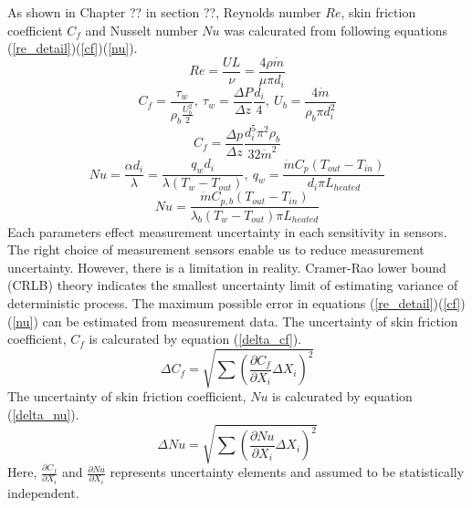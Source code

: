 \documentclass[12pt,oneside]{jbook}
\begin{document}
As shown in Chapter ?? in section ??, Reynolds number $Re$, skin friction coefficient $C_{f}$ and Nusselt number $Nu$ was calcurated from following equations (\ref{re_detail})(\ref{cf})(\ref{nu}).
\begin{equation}
    Re = \frac{UL}{\nu} = \frac{4\rho \dot{m}}{\mu \pi d_{i}}
    \label{re_detail}
\end{equation}
\begin{equation}
    C_{f} = \frac{\tau_{w}}{\rho_{b}\frac{U_{b}^{2}}{2}}, \ \tau_{w}=\frac{\Delta P}{\Delta z}\frac{d_{i}}{4}, \ U_{b}=\frac{4\dot{m}}{\rho_{b}\pi d_{i}^{2}}
    \label{cf_detail}
\end{equation}
\begin{equation}
    C_{f} = \frac{\Delta p}{\Delta z} \frac{d_{i}^{5}\pi^{2}\rho_{b}}{32\dot{m}^{2}}
    \label{cf}
\end{equation}
\begin{equation}
   Nu = \frac{\alpha d_{i}}{\lambda} = \frac{q_{w}d_{i}}{\lambda \left( T_{w}-T_{out} \right)}, \ q_{w}=\frac{\dot{m}C_{p} \left( T_{out}-T_{in} \right)}{d_{i}\pi L_{heated}}
   \label{nu_detail}
\end{equation}
\begin{equation}
   Nu = \frac{\dot{m}C_{p,b} \left( T_{out} - T_{in} \right) }{\lambda_{b} \left( T_{w} - T_{out} \right) \pi L_{heated}}
   \label{nu}
\end{equation}
Each parameters effect measurement uncertainty in each sensitivity in sensors.
The right choice of measurement sensors enable us to reduce measurement uncertainty.
However, there is a limitation in reality.
Cramer-Rao lower bound (CRLB) theory indicates the smallest uncertainty limit of estimating variance of deterministic process.
The maximum possible error in equations (\ref{re_detail})(\ref{cf})(\ref{nu}) can be estimated from measurement data.
The uncertainty of skin friction coefficient, $C_{f}$ is calcurated by equation (\ref{delta_cf}).
\begin{equation}
   \Delta C_{f} = \sqrt{\sum \left( \frac{\partial C_{f}}{\partial X_{i}}\Delta X_{i} \right)^{2}}
   \label{delta_cf}
\end{equation}
The uncertainty of skin friction coefficient, $Nu$ is calcurated by equation (\ref{delta_nu}).
\begin{equation}
   \Delta Nu = \sqrt{\sum \left( \frac{\partial Nu}{\partial X_{i}}\Delta X_{i} \right)^{2}}
   \label{delta_nu}
\end{equation}
Here, $\frac{\partial C_{f}}{\partial X_{i}}$ and $\frac{\partial Nu}{\partial X_{i}}$ represents uncertainty elements and assumed to be statistically independent.
\end{document}
